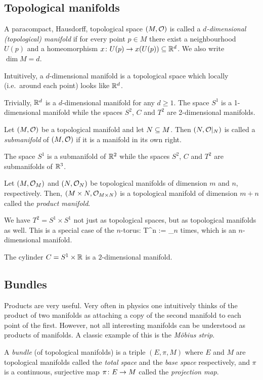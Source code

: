 \subsection{Topological manifolds}

\bd
A paracompact, Hausdorff, topological space $(M,\mathcal{O})$ is called a \emph{$d$-dimensional (topological) manifold} if for every point $p\in M$ there exist a neighbourhood $U(p)$ and a homeomorphism $x\colon U(p) \to x(U(p)) \subseteq \mathbb{R}^d$. We also write $\dim M = d$.
\ed

Intuitively, a $d$-dimensional manifold is a topological space which locally (i.e.\ around each point) looks like $\mathbb{R}^d$.

\be
Trivially, $\mathbb{R}^d$ is a $d$-dimensional manifold for any $d \geq 1$. The space $S^1$ is a 1-dimensional manifold while the spaces $S^2$, $C$ and $T^2$ are 2-dimensional manifolds.
\ee

\bd
Let $(M,\mathcal{O})$ be a topological manifold and let $N \subseteq M$. Then $(N,\mathcal{O}|_N)$ is called a \emph{submanifold} of $(M,\mathcal{O})$ if it is a manifold in its own right.
\ed

\be
The space $S^1$ is a submanifold of $\mathbb{R}^2$ while the spaces $S^2$, $C$ and $T^2$ are submanifolds of $\mathbb{R}^3$. 
\ee

\bd
Let $(M,\mathcal{O}_M)$ and $(N,\mathcal{O}_N)$ be topological manifolds of dimension $m$ and $n$, respectively. Then, $(M\times N,\mathcal{O}_{M\times N})$ is a topological manifold of dimension $m+n$ called the \emph{product manifold}.
\ed

\be
We have $T^2=S^1\times S^1$ not just as topological spaces, but as topological manifolds as well. This is a special case of the $n$-torus:
\bse
T^n := _{\t{$n$ times}},
\ese
which is an $n$-dimensional manifold.
\ee

\be
The cylinder $C=S^1\times \mathbb{R}$ is a $2$-dimensional manifold.
\ee

\subsection{Bundles}

Products are very useful. Very often in physics one intuitively thinks of the product of two manifolds as attaching a copy of the second manifold to each point of the first.  However, not all interesting manifolds can be understood as products of manifolds. A classic example of this is the \emph{M\"obius strip}.


\bd
A \emph{bundle} (of topological manifolds) is a triple $(E,\pi,M)$ where $E$ and $M$ are topological manifolds called the \emph{total space} and the \emph{base space} respectively, and $\pi$ is a continuous, surjective map $\pi\colon E \to M$ called the \emph{projection map}.
\ed

